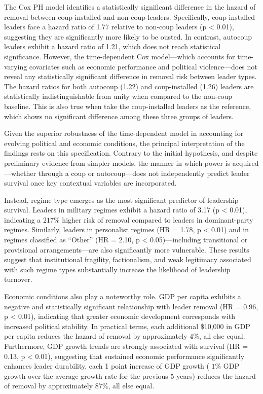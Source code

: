 \documentclass[
  12pt,
]{report}
\begin{document}
The Cox PH model identifies a statistically significant difference in
the hazard of removal between coup-installed and non-coup leaders.
Specifically, coup-installed leaders face a hazard ratio of 1.77
relative to non-coup leaders (p \textless{} 0.01), suggesting they are
significantly more likely to be ousted. In contrast, autocoup leaders
exhibit a hazard ratio of 1.21, which does not reach statistical
significance. However, the time-dependent Cox model---which accounts for
time-varying covariates such as economic performance and political
violence---does not reveal any statistically significant difference in
removal risk between leader types. The hazard ratios for both autocoup
(1.22) and coup-installed (1.26) leaders are statistically
indistinguishable from unity when compared to the non-coup baseline.
This is also true when take the coup-installed leaders as the reference,
which shows no significant difference among these three groups of
leaders.

Given the superior robustness of the time-dependent model in accounting
for evolving political and economic conditions, the principal
interpretation of the findings rests on this specification. Contrary to
the initial hypothesis, and despite preliminary evidence from simpler
models, the manner in which power is acquired---whether through a coup
or autocoup---does not independently predict leader survival once key
contextual variables are incorporated.

Instead, regime type emerges as the most significant predictor of
leadership survival. Leaders in military regimes exhibit a hazard ratio
of 3.17 (p \textless{} 0.01), indicating a \(217\%\) higher risk of
removal compared to leaders in dominant-party regimes. Similarly,
leaders in personalist regimes (HR = 1.78, p \textless{} 0.01) and in
regimes classified as ``Other'' (HR = 2.10, p \textless{}
0.05)---including transitional or provisional arrangements---are also
significantly more vulnerable. These results suggest that institutional
fragility, factionalism, and weak legitimacy associated with such regime
types substantially increase the likelihood of leadership turnover.

Economic conditions also play a noteworthy role. GDP per capita exhibits
a negative and statistically significant relationship with leader
removal (HR = 0.96, p \textless{} 0.01), indicating that greater
economic development corresponds with increased political stability. In
practical terms, each additional \$10,000 in GDP per capita reduces the
hazard of removal by approximately \(4\%\), all else equal. Furthermore,
GDP growth trends are strongly associated with survival (HR = 0.13, p
\textless{} 0.01), suggesting that sustained economic performance
significantly enhances leader durability, each 1 point increase of GDP
growth ( \(1\%\) GDP growth over the average growth rate for the
previous 5 years) reduces the hazard of removal by approximately
\(87\%\), all else equal.
\end{document}
